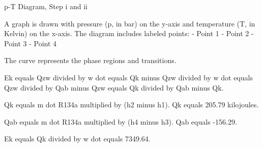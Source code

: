 p-T Diagram, Step i and ii  

A graph is drawn with pressure (p, in bar) on the y-axis and temperature (T, in Kelvin) on the x-axis. The diagram includes labeled points:  
- Point 1  
- Point 2  
- Point 3  
- Point 4  

The curve represents the phase regions and transitions.

Ek equals Qzw divided by w dot equals Qk minus Qzw divided by w dot equals Qzw divided by Qab minus Qzw equals Qk divided by Qab minus Qk.  

Qk equals m dot R134a multiplied by (h2 minus h1).  
Qk equals 205.79 kilojoules.  

Qab equals m dot R134a multiplied by (h4 minus h3).  
Qab equals -156.29.  

Ek equals Qk divided by w dot equals 7349.64.